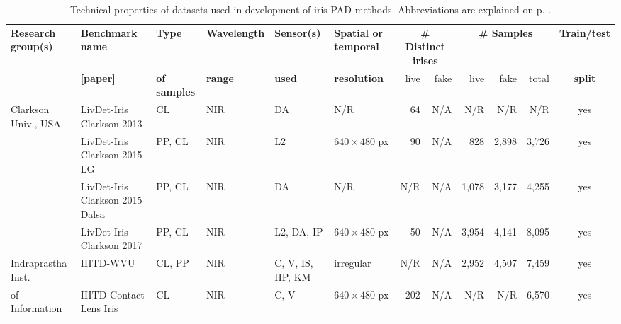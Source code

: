 \documentclass[format=acmsmall, review=false, timestamp=false]{acmart}
\begin{document}
\clearpage
\noindent
\begin{landscape}
\begin{table}[htb!]
    \begin{center}
        \caption{Technical properties of datasets used in development of iris PAD methods. Abbreviations are explained on p. \pageref{tabs:explanation}.}
        \label{tab:BenchmarkDatabases}
        \tiny
        \vskip-3mm
        \begin{threeparttable}
        \begin{tabular}{llllllrrrrrc}
            {\bf Research group(s)}
            & {\bf Benchmark name}
            & {\bf Type}        
            & {\bf Wavelength}
            & {\bf Sensor(s)}
            & {\bf Spatial or temporal}
            & \multicolumn{2}{c}{{\bf \# Distinct irises}}
            & \multicolumn{3}{c}{{\bf \# Samples}}
            & {\bf Train/test} \\
            & {\bf [paper] \color{blue}{[www link]}} & {\bf of samples} & {\bf range} & {\bf used} & {\bf resolution} & live & fake\tnote{1} & live & fake & total & {\bf split}\\
            \hline
            \hline
            Clarkson Univ., USA & {\sf LivDet-Iris Clarkson 2013} \cite{Yambay_IJCB_2014} & CL & NIR & DA &  N/R  & 64 & {N/A} & N/R & N/R & N/R & {yes} \\
            & {\sf LivDet-Iris Clarkson 2015 LG} \cite{Yambay_ISBA_2017} & PP, CL & NIR & L2 & $640 \times 480$ px& 90 & {N/A} & 828 & 2,898 & 3,726 & {yes} \\
             & {\sf LivDet-Iris Clarkson 2015 Dalsa} \cite{Yambay_ISBA_2017} & PP, CL & NIR & DA & N/R & N/R & {N/A} & 1,078 & 3,177 & 4,255 & {yes} \\ 
             & {\sf LivDet-Iris Clarkson 2017}\tnote{2}\hskip2mm\cite{Yambay_IJCB_2017} & PP, CL & NIR & L2, DA, IP & $640 \times 480$ px\tnote{3}& 50 & {N/A} & 3,954 & 4,141 & 8,095 & {yes} \\
            \hline
            Indraprastha Inst. & {\sf IIITD-WVU}\tnote{4}\hskip2mm\cite{Yambay_IJCB_2017}\color{blue}{\cite{IIITD_DBs_URL}} & CL, PP & NIR & C, V, IS, HP, KM & irregular\tnote{5} & N/R & {N/A} & 2,952 & 4,507 & 7,459 & {yes} \\
            of Information & {\sf IIITD Contact Lens Iris} \cite{Kohli_ICB_2013} \color{blue}{\cite{IIITD_DBs_URL}} & CL & NIR & C, V & $640 \times 480$ px& 202 & {N/A} & N/R & N/R & 6,570 & {yes} \\ 

\end{tabular}
\end{threeparttable}
\end{center}
\end{table}
\end{landscape}
\end{document}
